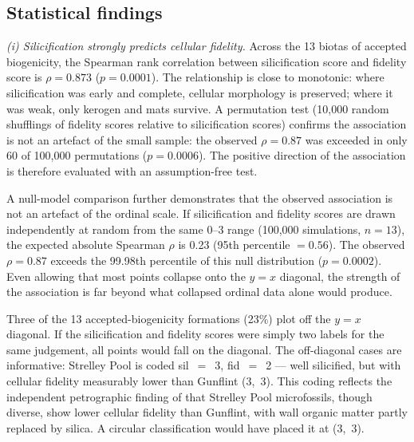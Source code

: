 \documentclass[11pt]{article}
\begin{document}
\subsection{Statistical findings}

\textit{(i) Silicification strongly predicts cellular fidelity.} Across the 13 biotas of accepted
biogenicity, the Spearman rank correlation between silicification score and fidelity score is
$\rho = 0.873$ ($p = 0.0001$). The relationship is close to monotonic: where silicification was
early and complete, cellular morphology is preserved; where it was weak, only kerogen and mats
survive. A permutation test (10{,}000 random shufflings of fidelity scores relative to silicification
scores) confirms the association is not an artefact of the small sample: the observed $\rho = 0.87$
was exceeded in only 60 of 100{,}000 permutations ($p = 0.0006$). The positive direction of the
association is therefore evaluated with an assumption-free test.

A null-model comparison further demonstrates that the observed association is not an artefact of the
ordinal scale. If silicification and fidelity scores are drawn independently at random from the same
0--3 range (100{,}000 simulations, $n = 13$), the expected absolute Spearman $\rho$ is 0.23 (95th
percentile $= 0.56$). The observed $\rho = 0.87$ exceeds the 99.98th percentile of this null
distribution ($p = 0.0002$). Even allowing that most points collapse onto the $y = x$ diagonal, the
strength of the association is far beyond what collapsed ordinal data alone would produce.

Three of the 13 accepted-biogenicity formations (23\%) plot off the $y = x$ diagonal. If the
silicification and fidelity scores were simply two labels for the same judgement, all points would
fall on the diagonal. The off-diagonal cases are informative: Strelley Pool is coded sil~$=$~3,
fid~$=$~2 --- well silicified, but with cellular fidelity measurably lower than Gunflint (3,~3). This
coding reflects the independent petrographic finding of \citet{Wacey2012} that Strelley Pool
microfossils, though diverse, show lower cellular fidelity than Gunflint, with wall organic matter
partly replaced by silica. A circular classification would have placed it at (3,~3).
\end{document}
